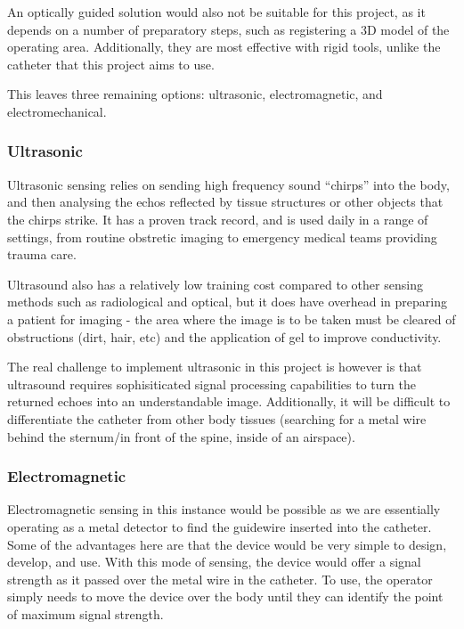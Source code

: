 \documentclass[a4paper]{article}
\begin{document}
        An optically guided solution would also not be suitable for this project, as it depends on a number of preparatory steps, such as registering a 3D model of the operating area. Additionally, they are most effective with rigid tools, unlike the catheter that this project aims to use.

        This leaves three remaining options: ultrasonic, electromagnetic, and electromechanical.

            \subsubsection{Ultrasonic}
            Ultrasonic sensing relies on sending high frequency sound ``chirps'' into the body, and then analysing the echos reflected by tissue structures or other objects that the chirps strike. It has a proven track record, and is used daily in a range of settings, from routine obstretic imaging to emergency medical teams providing trauma care.

            Ultrasound also has a relatively low training cost compared to other sensing methods such as radiological and optical, but it does have overhead in preparing a patient for imaging - the area where the image is to be taken must be cleared of obstructions (dirt, hair, etc) and the application of gel to improve conductivity.

            The real challenge to implement ultrasonic in this project is however is that ultrasound requires sophisiticated signal processing capabilities to turn the returned echoes into an understandable image. Additionally, it will be difficult to differentiate the catheter from other body tissues (searching for a metal wire behind the sternum\slash in front of the spine, inside of an airspace).

            \subsubsection{Electromagnetic}
            Electromagnetic sensing in this instance would be possible as we are essentially operating as a metal detector to find the guidewire inserted into the catheter. Some of the advantages here are that the device would be very simple to design, develop, and use. With this mode of sensing, the device would offer a signal strength as it passed over the metal wire in the catheter. To use, the operator simply needs to move the device over the body until they can identify the point of maximum signal strength.
\end{document}
